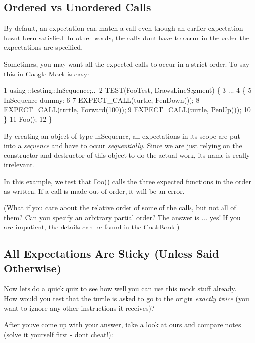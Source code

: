 \subsection*{Ordered vs Unordered Calls}

By default, an expectation can match a call even though an earlier expectation hasn\textquotesingle{}t been satisfied. In other words, the calls don\textquotesingle{}t have to occur in the order the expectations are specified.

Sometimes, you may want all the expected calls to occur in a strict order. To say this in Google \hyperlink{class_mock}{Mock} is easy\+:


\begin{DoxyCode}
1 using ::testing::InSequence;...
2 TEST(FooTest, DrawsLineSegment) \{
3   ...
4   \{
5     InSequence dummy;
6 
7     EXPECT\_CALL(turtle, PenDown());
8     EXPECT\_CALL(turtle, Forward(100));
9     EXPECT\_CALL(turtle, PenUp());
10   \}
11   Foo();
12 \}
\end{DoxyCode}


By creating an object of type {\ttfamily In\+Sequence}, all expectations in its scope are put into a {\itshape sequence} and have to occur {\itshape sequentially}. Since we are just relying on the constructor and destructor of this object to do the actual work, its name is really irrelevant.

In this example, we test that {\ttfamily Foo()} calls the three expected functions in the order as written. If a call is made out-\/of-\/order, it will be an error.

(What if you care about the relative order of some of the calls, but not all of them? Can you specify an arbitrary partial order? The answer is ... yes! If you are impatient, the details can be found in the Cook\+Book.)

\subsection*{All Expectations Are Sticky (Unless Said Otherwise)}

Now let\textquotesingle{}s do a quick quiz to see how well you can use this mock stuff already. How would you test that the turtle is asked to go to the origin {\itshape exactly twice} (you want to ignore any other instructions it receives)?

After you\textquotesingle{}ve come up with your answer, take a look at ours and compare notes (solve it yourself first -\/ don\textquotesingle{}t cheat!)\+:


